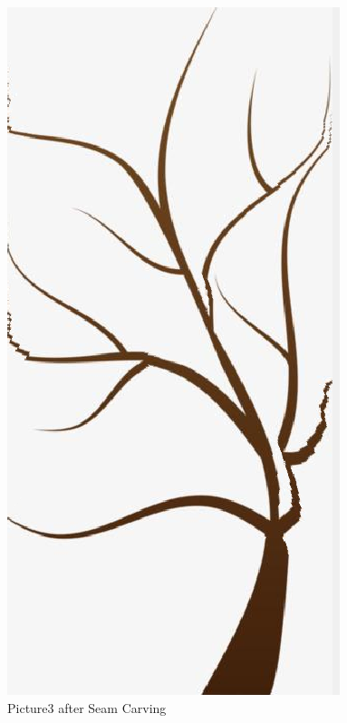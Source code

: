 \documentclass[final]{cvpr}
\begin{document}
\begin{figure}
\begin{center}
    \includegraphics[scale=0.2]{pics/3-2.png}
    \caption{Picture3 after Seam Carving}

\end{center}
\end{figure}
\end{document}
